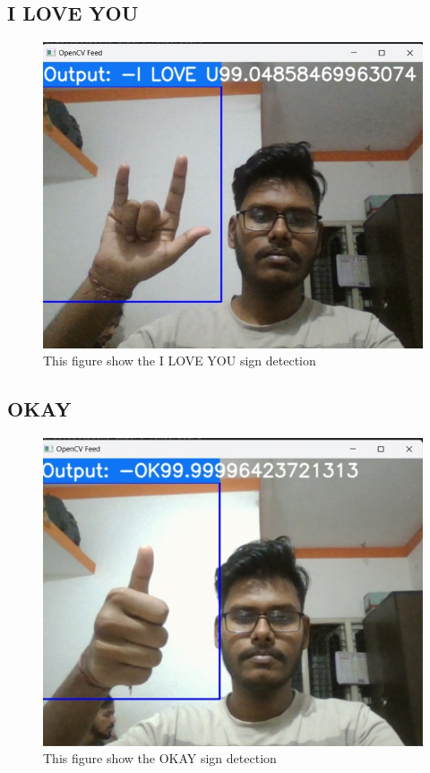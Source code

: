 \subsection{I LOVE YOU}
\begin{figure}[ht]
    \centering
    \includegraphics[width=1.0\linewidth]{images/love.jpg}
    \caption{This figure show the I LOVE YOU sign detection}
    \label{fig:flowchart-sign-language}
\end{figure}
\newpage
\subsection{OKAY}
\begin{figure}[ht]
    \centering
    \includegraphics[width=1.0\linewidth]{images/okay.jpg}
    \caption{This figure show the OKAY sign detection}
    \label{fig:flowchart-sign-language}
\end{figure}
\newpage
